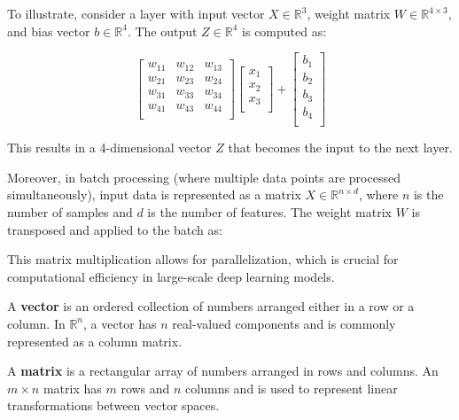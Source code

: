 \documentclass{article}
\begin{document}
To illustrate, consider a layer with input vector $X \in \mathbb{R}^3$, weight matrix $W \in \mathbb{R}^{4 \times 3}$, and bias vector $b \in \mathbb{R}^4$. The output $Z \in \mathbb{R}^4$ is computed as:

\[
    \begin{bmatrix}
    w_{11} & w_{12} & w_{13} \\
    w_{21} & w_{23} & w_{24} \\
    w_{31} & w_{33} & w_{34} \\
    w_{41} & w_{43} & w_{44} \\
    \end{bmatrix}
    \begin{bmatrix}
    x_{1} \\
    x_{2} \\
    x_{3} \\
    \end{bmatrix}
    +
    \begin{bmatrix}
    b_{1} \\
    b_{2} \\
    b_{3} \\
    b_{4} \\
    \end{bmatrix}
\]

This results in a 4-dimensional vector $Z$ that becomes the input to the next layer.

Moreover, in batch processing (where multiple data points are processed simultaneously), input data is represented as a matrix $X \in \mathbb{R}^{n \times d}$, where $n$ is the number of samples and $d$ is the number of features. The weight matrix $W$ is transposed and applied to the batch as:

This matrix multiplication allows for parallelization, which is crucial for computational efficiency in large-scale deep learning models.

\begin{definition}\label{def:vector}
    A \textbf{vector} is an ordered collection of numbers arranged either in a row or a column. In $\mathbb{R}^n$, a vector has $n$ real-valued components and is commonly represented as a column matrix.
\end{definition}

\begin{definition}\label{def:matrix}
    A \textbf{matrix} is a rectangular array of numbers arranged in rows and columns. An $m \times n$ matrix has $m$ rows and $n$ columns and is used to represent linear transformations between vector spaces.
\end{definition}
\end{document}

